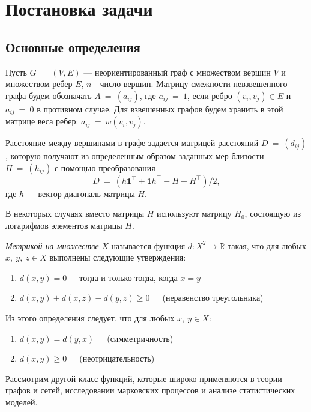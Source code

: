 \chapter{Постановка задачи} \label{chapt1}

\section{Основные определения} \label{sect1_1}

Пусть $G~=~(V, E)$ --- неориентированный граф с множеством вершин $V$ и множеством ребер $E$, $n$ - число вершин. Матрицу смежности невзвешенного графа будем обозначать $A~=~(a_{ij})$, где $a_{ij}~=~1$, если ребро $(v_i, v_j) \in E$ и $a_{ij}~=~0$ в противном случае. Для взвешенных графов будем хранить в этой матрице веса ребер: $a_{ij}~=~w(v_i, v_j)$.

Расстояние между вершинами в графе задается матрицей расстояний $D~=~(d_{ij})$, которую получают из определенным образом заданных мер близости $H~=~(h_{ij})$ с помощью преобразования
$$D~=~(h \textbf{1}^\intercal + \textbf{1} h^\intercal - H - H ^\intercal) /2, $$
где $h$ --- вектор-диагональ матрицы $H$.

В некоторых случаях вместо матрицы $H$ используют матрицу $H_0$, состоящую из логарифмов элементов матрицы $H$.


\begin{definition}
\emph{Метрикой на множестве} $X$ называется функция $d: X^2\rightarrow \mathbb{R}$ такая, что для любых $x,\ y,\ z \in X$ выполнены следующие утверждения:
\begin{enumerate}
\item $d(x,y) = 0$\ \ \  тогда и только тогда, когда $x=y$
\item $d(x,y) + d(x,z) - d(y,z) \ge 0$\ \ \  (неравенство треугольника)
\end{enumerate}
\end{definition}

Из этого определения следует, что для любых $x,\ y \in X$:

\begin{enumerate}
\item $d(x,y) = d(y,x)$\ \ \ (симметричность)
\item $d(x,y) \ge 0$\ \ \  (неотрицательность)
\end{enumerate}


Рассмотрим другой класс функций, которые широко применяются в теории графов и сетей, исследовании марковских процессов и анализе статистических моделей.

